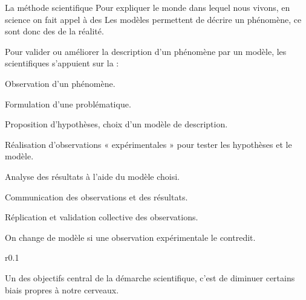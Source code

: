 \begin{doc}{La méthode scientifique}
  Pour expliquer le monde dans lequel nous vivons, en science on fait appel à des  
  Les modèles permettent de décrire un phénomène, ce sont donc des  de la réalité.

  Pour valider ou améliorer la description d'un phénomène par un modèle, les scientifiques s'appuient sur la  :
  \begin{enumeration}
    \item Observation d'un phénomène.
    \item Formulation d'une problématique.
    \item Proposition d'hypothèses, choix d'un modèle de description.
    \item Réalisation d'observations « expérimentales » pour tester les hypothèses et le modèle.
    \item Analyse des résultats à l'aide du modèle choisi.
    \item Communication des observations et des résultats.
    \item Réplication et validation collective des observations.
  \end{enumeration}

  \flecheLongue On change de modèle si une observation expérimentale le contredit.
  \bigskip

  \begin{wrapfigure}[0]{r}{0.1\linewidth}
    \vspace*{-90pt}
  \end{wrapfigure}
  Un des objectifs central de la démarche scientifique, c'est de diminuer certains biais propres à notre cerveaux.
\end{doc}


